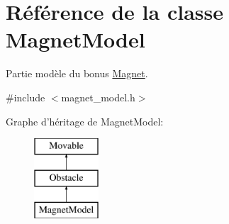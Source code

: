 \hypertarget{class_magnet_model}{\section{Référence de la classe Magnet\+Model}
\label{class_magnet_model}
}


Partie modèle du bonus \hyperlink{class_magnet}{Magnet}.  




{\ttfamily \#include $<$magnet\+\_\+model.\+h$>$}

Graphe d'héritage de Magnet\+Model\+:\begin{figure}[H]
\begin{center}
\leavevmode
\includegraphics[height=3.000000cm]{class_magnet_model}
\end{center}
\end{figure}
